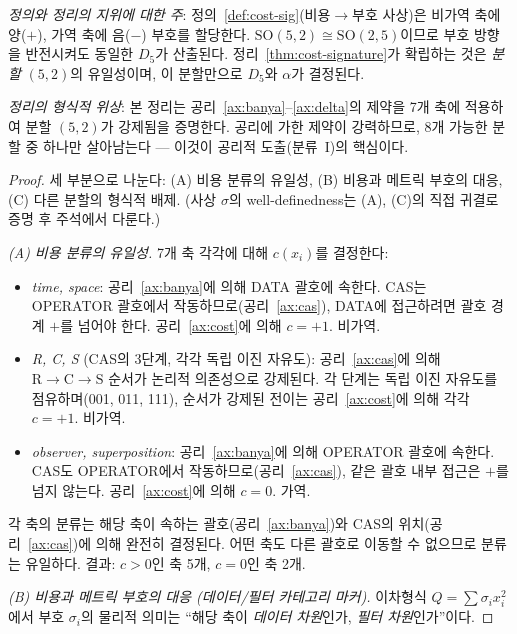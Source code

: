 \documentclass[entropy,article,submit,pdftex,oneauthor]{Definitions/mdpi}
\begin{document}
\textit{정의와 정리의 지위에 대한 주}: 정의~\ref{def:cost-sig}(비용$\to$부호 사상)은 비가역 축에 양($+$), 가역 축에 음($-$) 부호를 할당한다. $\mathrm{SO}(5,2) \cong \mathrm{SO}(2,5)$이므로 부호 방향을 반전시켜도 동일한 $D_5$가 산출된다. 정리~\ref{thm:cost-signature}가 확립하는 것은 \emph{분할} $(5,2)$의 유일성이며, 이 분할만으로 $D_5$와 $\alpha$가 결정된다.

\textit{정리의 형식적 위상}: 본 정리는 공리~\ref{ax:banya}--\ref{ax:delta}의 제약을 7개 축에 적용하여 분할 $(5,2)$가 강제됨을 증명한다. 공리에 가한 제약이 강력하므로, 8개 가능한 분할 중 하나만 살아남는다 --- 이것이 공리적 도출(분류~I)의 핵심이다.

\begin{proof}
세 부분으로 나눈다: (A) 비용 분류의 유일성, (B) 비용과 메트릭 부호의 대응, (C) 다른 분할의 형식적 배제. (사상 $\sigma$의 well-definedness는 (A), (C)의 직접 귀결로 증명 후 주석에서 다룬다.)

\emph{(A) 비용 분류의 유일성.} 7개 축 각각에 대해 $c(x_i)$를 결정한다:
\begin{itemize}
\item \emph{time, space}: 공리~\ref{ax:banya}에 의해 DATA 괄호에 속한다. CAS는 OPERATOR 괄호에서 작동하므로(공리~\ref{ax:cas}), DATA에 접근하려면 괄호 경계 $+$를 넘어야 한다. 공리~\ref{ax:cost}에 의해 $c = +1$. 비가역.
\item \emph{R, C, S} (CAS의 3단계, 각각 독립 이진 자유도): 공리~\ref{ax:cas}에 의해 $\mathrm{R} \to \mathrm{C} \to \mathrm{S}$ 순서가 논리적 의존성으로 강제된다. 각 단계는 독립 이진 자유도를 점유하며(001, 011, 111), 순서가 강제된 전이는 공리~\ref{ax:cost}에 의해 각각 $c = +1$. 비가역.
\item \emph{observer, superposition}: 공리~\ref{ax:banya}에 의해 OPERATOR 괄호에 속한다. CAS도 OPERATOR에서 작동하므로(공리~\ref{ax:cas}), 같은 괄호 내부 접근은 $+$를 넘지 않는다. 공리~\ref{ax:cost}에 의해 $c = 0$. 가역.
\end{itemize}
각 축의 분류는 해당 축이 속하는 괄호(공리~\ref{ax:banya})와 CAS의 위치(공리~\ref{ax:cas})에 의해 완전히 결정된다. 어떤 축도 다른 괄호로 이동할 수 없으므로 분류는 유일하다. 결과: $c > 0$인 축 5개, $c = 0$인 축 2개.

\emph{(B) 비용과 메트릭 부호의 대응 (데이터/필터 카테고리 마커).} 이차형식 $Q = \sum \sigma_i x_i^2$에서 부호 $\sigma_i$의 물리적 의미는 ``해당 축이 \emph{데이터 차원}인가, \emph{필터 차원}인가''이다.


\end{proof}
\end{document}
